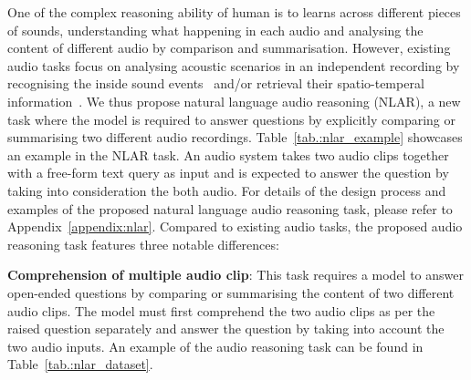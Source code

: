 \documentclass{article} %
\begin{document}
\begin{table}[t]
\centering
\caption{An example demonstrating APT-LLM's capacity of audio reasoning. It requires audio networks to comprehend recordings and reasoning across multiple recordings.}
\label{tab.:nlar_example}
\vspace{-0.3cm}
\end{table}

One of the complex reasoning ability of human is to learns across different pieces of sounds, understanding what happening in each audio and analysing the content of different audio by comparison and summarisation. However, existing audio tasks focus on analysing acoustic scenarios in an independent recording by recognising the inside sound events~\cite{kong_panns_2020} and/or retrieval their spatio-temperal information~\cite{politis_starss22_2022}. We thus propose natural language audio reasoning (NLAR), a new task where the model is required to answer questions by explicitly comparing or summarising two different audio recordings. Table~\ref{tab.:nlar_example} showcases an example in the NLAR task. An audio system takes two audio clips together with a free-form text query as input and is expected to answer the question by taking into consideration the both audio. For details of the design process and examples of the proposed natural language audio reasoning task, please refer to Appendix~\ref{appendix:nlar}. Compared to existing audio tasks, the proposed audio reasoning task features three notable differences:

\textbf{Comprehension of multiple audio clip}: This task requires a model to answer open-ended questions by comparing or summarising the content of two different audio clips. The model must first comprehend the two audio clips as per the raised question separately and answer the question by taking into account the two audio inputs. An example of the audio reasoning task can be found in Table~\ref{tab.:nlar_dataset}. 
\end{document}
